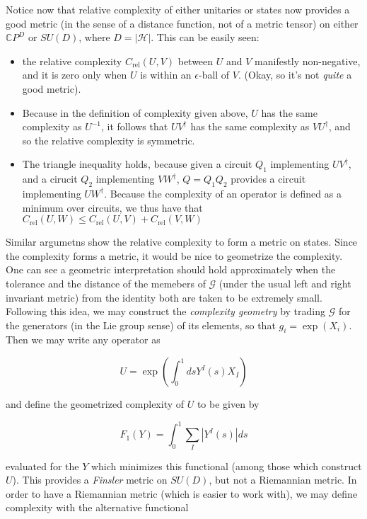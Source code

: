 \documentclass[12pt]{amsart}
\begin{document}
Notice now that relative complexity of either unitaries or states now provides a good metric (in the sense of a distance function, not of a metric tensor) on either $\mathbb{C}P^D$ or $SU(D)$, where $D = |\mathcal{H}|$. This can be easily seen:

\begin{itemize}

\item the relative complexity $C_{\text{rel}}(U,V)$ between $U$ and $V$ manifestly non-negative, and it is zero only when $U$ is within an $\epsilon$-ball of $V$. (Okay, so it's not {\it quite} a good metric).

\item Because in the definition of complexity given above, $U$ has the same complexity as $U^{-1}$, it follows that $UV^{\dagger}$ has the same complexity as $VU^{\dagger}$, and so the relative complexity is symmetric.

\item The triangle inequality holds, because given a circuit $Q_1$ implementing $UV^{\dagger}$, and a cirucit $Q_2$ implementing $VW^{\dagger}$, $Q = Q_1Q_2$ provides a circuit implementing $UW^{\dagger}$. Because the complexity of an operator is defined as a minimum over circuits, we thus have that $C_{\text{rel}}(U,W) \leq C_{\text{rel}}(U,V) + C_{\text{rel}}(V,W)$

\end{itemize}

Similar argumetns show the relative complexity to form a metric on states. Since the complexity forms a metric, it would be nice to geometrize the complexity. One can see a geometric interpretation should hold approximately when the tolerance and the distance of the memebers of $\mathcal{G}$ (under the usual left and right invariant metric) from the identity both are taken to be extremely small. Following this idea, we may construct the {\it complexity geometry} by trading $\mathcal{G}$ for the generators (in the Lie group sense) of its elements, so that $g_i = \exp(X_i)$. Then we may write any operator as 

$$U = \exp\left( \int_0^1 ds Y^I(s) X_I \right)$$

and define the geometrized complexity of $U$ to be given by

$$F_1(Y) = \int_0^1 \sum_I \left|Y^I(s)\right| ds$$

evaluated for the $Y$ which minimizes this functional (among those which construct $U$). This provides a {\it Finsler} metric on $SU(D)$, but not a Riemannian metric. In order to have a Riemannian metric (which is easier to work with), we may define complexity with the alternative functional 
\end{document}
